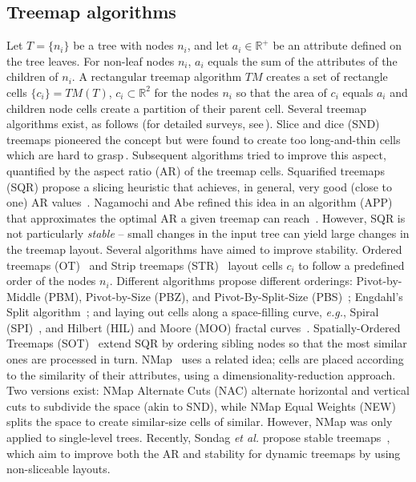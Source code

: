 \subsection{Treemap algorithms}
%
%
Let $T=\{n_i\}$ be a tree with nodes $n_i$, and let $a_i \in \mathbb{R}^{+}$ be an attribute defined on the tree leaves. For non-leaf nodes $n_i$, $a_i$ equals the sum of the attributes of the children of $n_i$. A rectangular treemap algorithm $TM$ creates a set of rectangle cells $\{c_i\} = TM(T)$, $c_i \subset \mathbb{R}^2$ for the nodes $n_i$ so that the area of $c_i$ equals $a_i$ and children node cells create a partition of their parent cell. Several treemap algorithms exist, as follows (for detailed surveys, see\,\cite{schulz11_treesurvey,hci_treemaps,treevis,landesberger11}). Slice and dice (SND) treemaps pioneered the concept but were found to create too long-and-thin cells which are hard to grasp\,\citep{shneiderman92}. Subsequent algorithms tried to improve this aspect, quantified by the aspect ratio (AR) of the treemap cells. Squarified treemaps (SQR) propose a slicing heuristic that achieves, in general, very good (close to one) AR values~\citep{sqr}. Nagamochi and Abe refined this idea in an algorithm (APP) that approximates the optimal AR a given treemap can reach~\citep{nagamochi07}. However, SQR is not particularly \emph{stable} -- small changes in the input tree can yield large changes in the treemap layout. Several algorithms have aimed to improve stability. Ordered treemaps (OT)~\citep{ordered} and Strip treemaps (STR)~\citep{bederson02} layout cells $c_i$ to follow a predefined order of the nodes $n_i$. Different algorithms propose different orderings: Pivot-by-Middle (PBM), Pivot-by-Size (PBZ), and Pivot-By-Split-Size (PBS)~\citep{ordered}; Engdahl's Split algorithm~\citep{engdahl}; and laying out cells along a space-filling curve, \emph{e.g.}, Spiral (SPI)~\citep{spiral}, and Hilbert (HIL) and Moore (MOO) fractal curves~\citep{hilbert_moore}. Spatially-Ordered Treemaps (SOT)~\citep{sot} extend SQR by ordering sibling nodes so that the most similar ones are processed in turn. NMap~\citep{nmap} uses a related idea; cells are placed according to the similarity of their attributes, using a dimensionality-reduction approach. Two versions exist: NMap Alternate Cuts (NAC) alternate horizontal and vertical cuts to subdivide the space (akin to SND), while NMap Equal Weights (NEW) splits the space to create similar-size cells of similar. However, NMap was only applied to single-level trees. Recently, Sondag \emph{et al.} propose stable treemaps~\citep{sondag17}, which aim to improve both the AR and stability for dynamic treemaps by using non-sliceable layouts.

